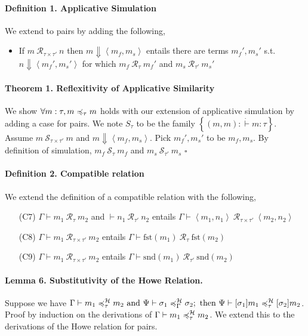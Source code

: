 \documentclass{article}
\begin{document}
\paragraph{Definition 1. Applicative Simulation} We extend to pairs by adding the following, \begin{itemize}
    \item If \(m ~\mathcal{R}_{\tau\times\tau'}~n\) then \(m\Downarrow \left\langle m_f,m_s \right\rangle \) entails there are terms \(m_f',m_s'\) s.t. \(n\Downarrow \left\langle m_f',m_s' \right\rangle \) for which \(m_f ~\mathcal{R}_{\tau}~m_f'\) and \(m_s ~\mathcal{R}_{\tau'}~m_s'\)
\end{itemize}

\paragraph{Theorem 1. Reflexitivity of Applicative Similarity} We show \(\forall m:\tau,m\asim m\) holds with our extension of applicative simulation by adding a case for pairs. We note \(S_{\tau}\) to be the family \(\left\{ (m,m) : \dot\vdash m:\tau \right\} \). Assume \(m~\mathcal{S}_{\tau\times\tau'}~m\) and \(m\Downarrow \left\langle m_f,m_s \right\rangle \). Pick \(m_f',m_s'\) to be \(m_f,m_s\). By definition of simulation, \(m_f~\mathcal{S}_{\tau}~m_f\) and \(m_s~\mathcal{S}_{\tau'}~m_s\) \hfill \(\square\)

\paragraph{Definition 2. Compatible relation} We extend the definition of a compatible relation with the following, \begin{itemize}
    \item[(C7)] \(\Gamma\vdash m_1~\mathcal{R}_{\tau}~m_2\) and \(\vdash n_1~\mathcal{R}_{\tau'}~n_2\) entails \(\Gamma\vdash \left\langle m_1,n_1 \right\rangle ~\mathcal{R}_{\tau\times\tau'}~\left\langle m_2,n_2 \right\rangle \)
    \item[(C8)] \(\Gamma\vdash m_1~\mathcal{R}_{\tau\times\tau'}~m_2\) entails \(\Gamma\vdash \text{fst}(m_1)~\mathcal{R}_{\tau}~\text{fst}(m_2)\)
    \item[(C9)] \(\Gamma\vdash m_1~\mathcal{R}_{\tau\times\tau'}~m_2\) entails \(\Gamma\vdash \text{snd}(m_1)~\mathcal{R}_{\tau'}~\text{snd}(m_2)\)
\end{itemize}


\paragraph{Lemma 6. Substitutivity of the Howe Relation.} Suppose we have \(\Gamma\vdash m_1 \howe m_2 \text{ and } \Psi \vdash \sigma_1 \howe[\Gamma] \sigma_2; \text{ then } \Psi \vdash [\sigma_1]m_1 \howe{}
[\sigma_2]m_2\). Proof by induction on the derivations of \( \Gamma \vdash m_1 \howe m_2\). We extend this to the derivations of the Howe relation for pairs.
\end{document}
